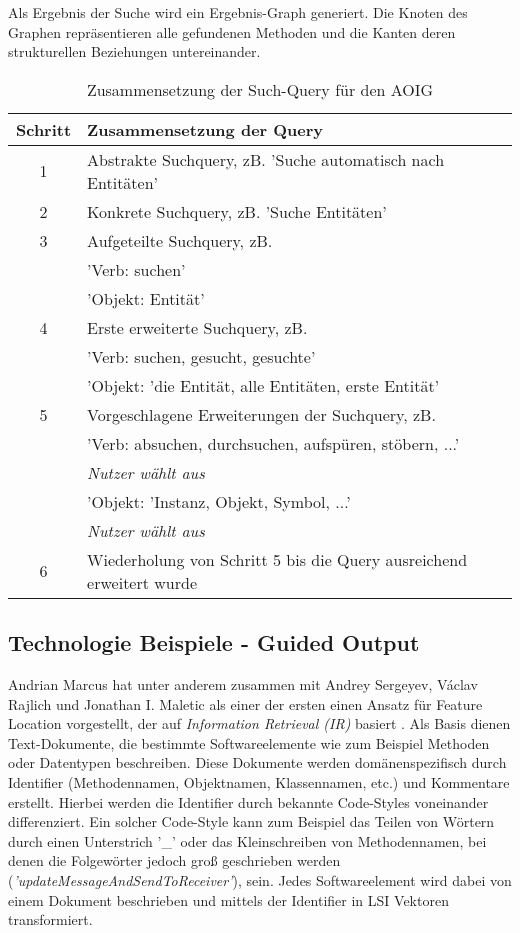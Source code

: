\documentclass[runningheads,a4paper]{llncs}
\begin{document}
Als Ergebnis der Suche wird ein Ergebnis-Graph generiert. Die Knoten des Graphen repräsentieren alle gefundenen Methoden und die Kanten deren strukturellen Beziehungen untereinander.

\begin{table}[h]
	\centering
\begin{tabular}{|c|l|}
	\hline
	\hspace{0.1cm} \textbf{Schritt} \hspace{0.1cm} & \textbf{Zusammensetzung der Query}\\
	\hline
	1 & Abstrakte Suchquery, zB. 'Suche automatisch nach Entitäten'\\
	\hline
	2 & Konkrete Suchquery, zB. 'Suche Entitäten'\\
	\hline
	3 & Aufgeteilte Suchquery, zB.\\
	& 'Verb: suchen'\\
	& 'Objekt: Entität'\\
	\hline
	4 & Erste erweiterte Suchquery, zB.\\
	& 'Verb: suchen, gesucht, gesuchte'\\
	& 'Objekt: 'die Entität, alle Entitäten, erste Entität'\\
	\hline
	5 & Vorgeschlagene Erweiterungen der Suchquery, zB.\\
	& 'Verb: absuchen, durchsuchen, aufspüren, stöbern, ...'\\
	& \textit{Nutzer wählt aus}\\
	& 'Objekt: 'Instanz, Objekt, Symbol, ...'\\
	& \textit{Nutzer wählt aus}\\
	\hline
	6 & Wiederholung von Schritt 5 bis die Query ausreichend erweitert wurde\\
	\hline
\end{tabular}
\label{query}
\vspace{0.2cm}
\caption{Zusammensetzung der Such-Query für den AOIG}
\end{table}

\subsection*{Technologie Beispiele - Guided Output}

Andrian Marcus hat unter anderem zusammen mit Andrey Sergeyev, Václav Rajlich und Jonathan I. Maletic als einer der ersten einen Ansatz für Feature Location vorgestellt, der auf \textit{Information Retrieval (IR)} basiert \cite{marcus1}\cite{marcus2}. Als Basis dienen Text-Dokumente, die bestimmte Softwareelemente wie zum Beispiel Methoden oder Datentypen beschreiben. Diese Dokumente werden domänenspezifisch durch Identifier (Methodennamen, Objektnamen, Klassennamen, etc.) und Kommentare erstellt. Hierbei werden die Identifier durch bekannte Code-Styles voneinander differenziert. Ein solcher Code-Style kann zum Beispiel das Teilen von Wörtern durch einen Unterstrich '\_' oder das Kleinschreiben von Methodennamen, bei denen die Folgewörter jedoch groß geschrieben werden (\textit{'updateMessageAndSendToReceiver'}), sein. Jedes Softwareelement wird dabei von einem Dokument beschrieben und mittels der Identifier in LSI Vektoren transformiert.
\end{document}
